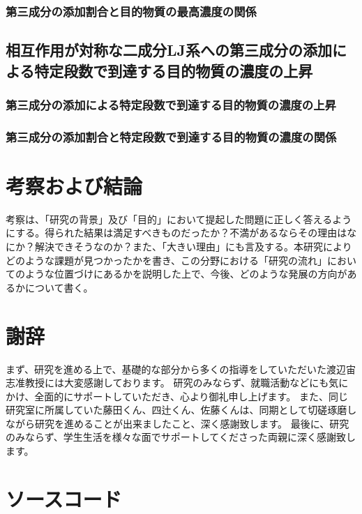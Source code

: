 \documentclass[titlepage]{jsreport}
\begin{document}
\subsection{第三成分の添加割合と目的物質の最高濃度の関係} \label{results-subsec:bi-component-addition-of-3rd-component-addition-ratio-highest-purity}


\section{相互作用が対称な二成分LJ系への第三成分の添加による特定段数で到達する目的物質の濃度の上昇} \label{results-sec:bi-component-addition-of-3rd-component-steps}
\subsection{第三成分の添加による特定段数で到達する目的物質の濃度の上昇} \label{results-subsec:bi-component-addition-of-3rd-component-steps}
\subsection{第三成分の添加割合と特定段数で到達する目的物質の濃度の関係} \label{results-subsec:bi-component-addition-of-3rd-component-addition-ratio-steps}


\chapter{考察および結論} \label{chap:summary}

考察は、「研究の背景」及び「目的」において提起した問題に正しく答えるようにする。得られた結果は満足すべきものだったか？不満があるならその理由はなにか？解決できそうなのか？また、「大きい理由」にも言及する。本研究によりどのような課題が見つかったかを書き、この分野における「研究の流れ」においてのような位置づけにあるかを説明した上で、今後、どのような発展の方向があるかについて書く。

\chapter*{謝辞}
まず、研究を進める上で、基礎的な部分から多くの指導をしていただいた渡辺宙志准教授には大変感謝しております。
研究のみならず、就職活動などにも気にかけ、全面的にサポートしていただき、心より御礼申し上げます。
また、同じ研究室に所属していた藤田くん、四辻くん、佐藤くんは、同期として切磋琢磨しながら研究を進めることが出来ましたこと、深く感謝致します。
最後に、研究のみならず、学生生活を様々な面でサポートしてくださった両親に深く感謝致します。

\appendix

\chapter{ソースコード}




\end{document}

